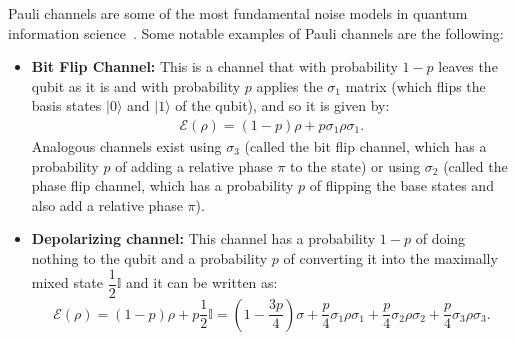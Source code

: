 \documentclass[10pt,letterpaper]{article} %
\begin{document}
Pauli channels are some of the 
most fundamental noise models in quantum information science~\cite{Terhal}. 
Some notable examples of Pauli channels are the following:
\begin{itemize}
\item \textbf{Bit Flip Channel:} This is a channel that with probability $1-p$ leaves the qubit as it is 
and with probability $p$ applies the $\sigma_1$ matrix 
(which flips the basis states $|0\rangle$ and $|1\rangle$ of the qubit), and
so it is given by:
\begin{align*}
\mathcal{E}(\rho) = (1-p) \rho + p \sigma_1 \rho \sigma_1.
\end{align*}
Analogous channels exist using $\sigma_3$ (called the bit flip channel,
which has a probability $p$ of adding a relative phase $\pi$ to the state) or 
using $\sigma_2$ (called the phase flip channel, 
which has a probability $p$ of 
flipping the base states and also add a relative phase $\pi$).
\item \textbf{Depolarizing channel:} 
This channel has a probability $1-p$
of doing nothing to the qubit and a probability $p$ of converting it into the maximally mixed state $\dfrac{1}{2} \mathbb{I}$
and it can be written as:
\begin{equation}
\mathcal{E}(\rho) = (1-p)\rho + p \dfrac{1}{2} \mathbb{I} = \left(1 - \dfrac{3p}{4} \right) \sigma + \dfrac{p}{4} \sigma_1 \rho \sigma_1 + \dfrac{p}{4} \sigma_2 \rho \sigma_2+ \dfrac{p}{4} \sigma_3 \rho \sigma_3.
\end{equation} 
\end{itemize}
\end{document}
